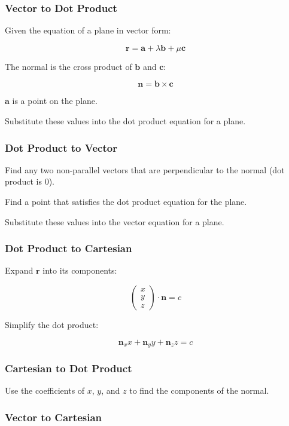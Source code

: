 \documentclass[a4paper,11pt]{article}
\newcommand{\bb}{\boldsymbol}
\begin{document}
\subsubsection{Vector to Dot Product}

Given the equation of a plane in vector form:

$$
\bb{r} = \bb{a} + \lambda \bb{b} + \mu \bb{c}
$$

The normal is the cross product of $\bb{b}$ and $\bb{c}$:

$$
\bb{n} = \bb{b} \times \bb{c}
$$

$\bb{a}$ is a point on the plane.

Substitute these values into the dot product equation for a plane.


\subsubsection{Dot Product to Vector}

Find any two non-parallel vectors that are perpendicular to the normal (dot
product is 0).

Find a point that satisfies the dot product equation for the plane.

Substitute these values into the vector equation for a plane.


\subsubsection{Dot Product to Cartesian}

Expand $\bb{r}$ into its components:

$$
\begin{pmatrix} x \\ y \\ z \end{pmatrix} \cdot \bb{n} = c
$$

Simplify the dot product:

$$
\bb{n}_x x + \bb{n}_y y + \bb{n}_z z = c
$$


\subsubsection{Cartesian to Dot Product}

Use the coefficients of $x$, $y$, and $z$ to find the components of the normal.


\subsubsection{Vector to Cartesian}
\end{document}
